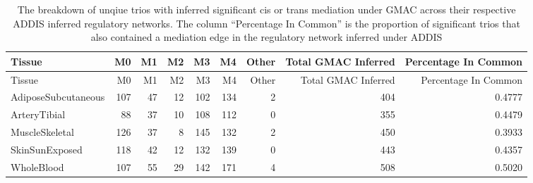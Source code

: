\documentclass[
]{article}
\begin{document}
\begin{longtable}[]{@{}lrrrrrrrr@{}}
\caption{The breakdown of unqiue trios with inferred significant cis or
trans mediation under GMAC across their respective ADDIS inferred
regulatory networks. The column ``Percentage In Common'' is the
proportion of significant trios that also contained a mediation edge in
the regulatory network inferred under ADDIS}\tabularnewline
\toprule
Tissue & M0 & M1 & M2 & M3 & M4 & Other & Total GMAC Inferred &
Percentage In Common\tabularnewline
\midrule
\endfirsthead
\toprule
Tissue & M0 & M1 & M2 & M3 & M4 & Other & Total GMAC Inferred &
Percentage In Common\tabularnewline
\midrule
\endhead
AdiposeSubcutaneous & 107 & 47 & 12 & 102 & 134 & 2 & 404 &
0.4777\tabularnewline
ArteryTibial & 88 & 37 & 10 & 108 & 112 & 0 & 355 &
0.4479\tabularnewline
MuscleSkeletal & 126 & 37 & 8 & 145 & 132 & 2 & 450 &
0.3933\tabularnewline
SkinSunExposed & 118 & 42 & 12 & 132 & 139 & 0 & 443 &
0.4357\tabularnewline
WholeBlood & 107 & 55 & 29 & 142 & 171 & 4 & 508 & 0.5020\tabularnewline
\bottomrule
\end{longtable}
\end{document}
